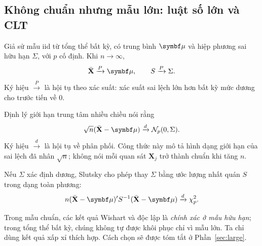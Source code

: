 


\subsection{Không chuẩn nhưng mẫu lớn: luật số lớn và CLT}
Giả sử mẫu iid từ tổng thể bất kỳ, có trung bình $\vmu$ và hiệp phương
sai hữu hạn $\Sigma$, với $p$ cố định. Khi $n\to\infty$,
\begin{equation}
 \Xbar\xrightarrow{P}\vmu,\qquad S\xrightarrow{P}\Sigma.
 \label{eq:lln}
\end{equation}
Ký hiệu $\xrightarrow{P}$ là hội tụ theo xác suất: xác suất sai lệch lớn
hơn bất kỳ mức dương cho trước tiến về 0.

Định lý giới hạn trung tâm nhiều chiều nói rằng
\begin{equation}
 \sqrt n(\Xbar-\vmu)\xrightarrow{d}\N_p(0,\Sigma).
 \label{eq:clt}
\end{equation}
Ký hiệu $\xrightarrow{d}$ là hội tụ về phân phối. Công thức này mô tả
hình dạng giới hạn của sai lệch đã nhân $\sqrt n$; không nói mỗi quan sát
$\mathbf X_j$ trở thành chuẩn khi tăng $n$.

Nếu $\Sigma$ xác định dương, Slutsky cho phép thay $\Sigma$ bằng ước lượng
nhất quán $S$ trong dạng toàn phương:
\begin{equation}
 n(\Xbar-\vmu)'S^{-1}(\Xbar-\vmu)\xrightarrow{d}\chi^2_p.
 \label{eq:slutsky}
\end{equation}


Trong mẫu chuẩn, các kết quả Wishart và độc lập là \emph{chính xác ở mẫu
hữu hạn}; trong tổng thể bất kỳ, chúng không tự được khôi phục chỉ vì mẫu
lớn. Ta chỉ dùng kết quả xấp xỉ thích hợp. Cách chọn sẽ được tóm tắt ở
Phần~\ref{sec:large}.

